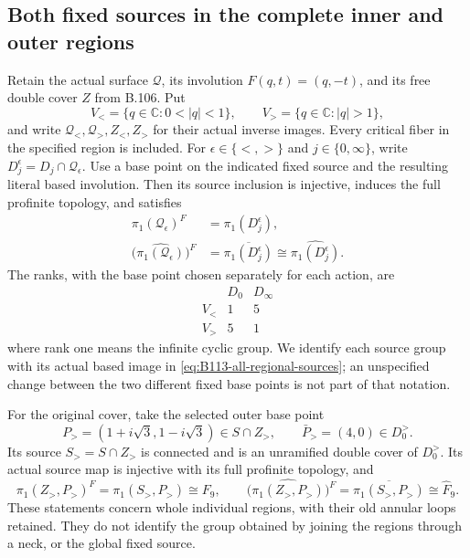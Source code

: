 \subsection*{Both fixed sources in the complete inner and outer regions}

\label{stmt:B113}
Retain the actual surface $\mathscr Q$, its involution
$F(q,t)=(q,-t)$, and its free double cover $Z$ from B.106.
Put
\[
 V_< =\{q\in\mathbb C:0<|q|<1\},\qquad
 V_> =\{q\in\mathbb C:|q|>1\},
\]
and write $\mathscr Q_<,\mathscr Q_>,Z_<,Z_>$ for their actual
inverse images. Every critical fiber in the specified region is
included. For $\epsilon\in\{<,>\}$ and $j\in\{0,\infty\}$,
write $D_j^\epsilon=D_j\cap\mathscr Q_\epsilon$. Use a base
point on the indicated fixed source and the resulting literal
based involution. Then its source inclusion is injective, induces
the full profinite topology, and satisfies
\begin{equation}\label{eq:B113-all-regional-sources}
 \begin{aligned}
 \pi_1(\mathscr Q_\epsilon)^F
       &=\pi_1(D_j^\epsilon),\\
 \bigl(\widehat{\pi_1(\mathscr Q_\epsilon)}\bigr)^F
       &=\overline{\pi_1(D_j^\epsilon)}
         \cong\widehat{\pi_1(D_j^\epsilon)}.
 \end{aligned}
\end{equation}
The ranks, with the base point chosen separately for each action,
are
\[
\begin{array}{c|cc}
 &D_0&D_\infty\\ \hline
 V_<&1&5\\
 V_>&5&1
\end{array}
\]
where rank one means the infinite cyclic group. We identify each
source group with its actual based image in
\eqref{eq:B113-all-regional-sources}; an unspecified change between
the two different fixed base points is not part of that notation.

For the original cover, take the selected outer base point
\[
 P_>=(1+i\sqrt3,1-i\sqrt3)\in S\cap Z_>,
 \qquad \bar P_>=(4,0)\in D_0^>.
\]
Its source $S_>=S\cap Z_>$ is connected and is an unramified
double cover of $D_0^>$. Its actual source map is injective with
its full profinite topology, and
\begin{equation}\label{eq:B113-original-outer}
 \pi_1(Z_>,P_>)^F=\pi_1(S_>,P_>)\cong F_9,
 \qquad
 \bigl(\widehat{\pi_1(Z_>,P_>)}\bigr)^F
       =\overline{\pi_1(S_>,P_>)}\cong\widehat F_9.
\end{equation}
These statements concern whole individual regions, with their old
annular loops retained. They do not identify the group obtained
by joining the regions through a neck, or the global fixed source.

